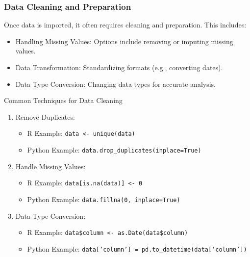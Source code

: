 \documentclass[aspectratio=169]{beamer}
\begin{document}
\begin{frame}
    \frametitle{Data Cleaning and Preparation}
    Once data is imported, it often requires cleaning and preparation. This includes:
    
    \begin{itemize}
        \item Handling Missing Values: Options include removing or imputing missing values.
        \item Data Transformation: Standardizing formats (e.g., converting dates).
        \item Data Type Conversion: Changing data types for accurate analysis.
    \end{itemize}

    \begin{block}{Common Techniques for Data Cleaning}
        \begin{enumerate}
            \item Remove Duplicates:
                \begin{itemize}
                    \item R Example: \texttt{data <- unique(data)}
                    \item Python Example: \texttt{data.drop\_duplicates(inplace=True)}
                \end{itemize}
            \item Handle Missing Values:
                \begin{itemize}
                    \item R Example: \texttt{data[is.na(data)] <- 0}
                    \item Python Example: \texttt{data.fillna(0, inplace=True)}
                \end{itemize}
            \item Data Type Conversion:
                \begin{itemize}
                    \item R Example: \texttt{data\$column <- as.Date(data\$column)}
                    \item Python Example: \texttt{data['column'] = pd.to\_datetime(data['column'])}
                \end{itemize}
        \end{enumerate}
    \end{block}
\end{frame}
\end{document}
